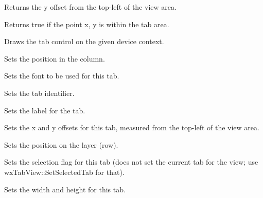 
Returns the y offset from the top-left of the view area.



Returns true if the point x, y is within the tab area.



Draws the tab control on the given device context.



Sets the position in the column.



Sets the font to be used for this tab.



Sets the tab identifier.



Sets the label for the tab.



Sets the x and y offsets for this tab, measured from the top-left of the view area.



Sets the position on the layer (row).



Sets the selection flag for this tab (does not set the current tab for the view;
use wxTabView::SetSelectedTab for that).



Sets the width and height for this tab.

